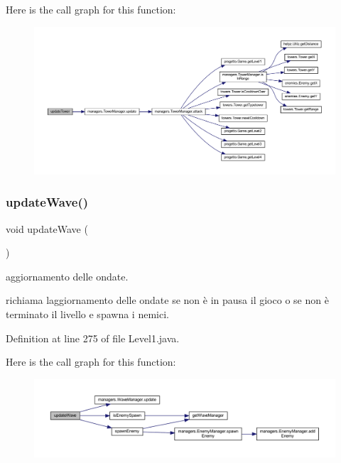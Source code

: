 Here is the call graph for this function\+:
\nopagebreak
\begin{figure}[H]
\begin{center}
\leavevmode
\includegraphics[width=350pt]{classscenes_1_1_level1_ae4fd4a959e4d782a5e7ac0eff77ba27f_cgraph}
\end{center}
\end{figure}
\mbox{\label{classscenes_1_1_level1_ab424ab29e7ab4733f2efd1e6ef3f13b1}} 
\subsubsection{\texorpdfstring{update\+Wave()}{updateWave()}}
{\footnotesize\ttfamily void update\+Wave (\begin{DoxyParamCaption}{ }\end{DoxyParamCaption})}



aggiornamento delle ondate. 

richiama l\textquotesingle{}aggiornamento delle ondate se non è in pausa il gioco o se non è terminato il livello e spawna i nemici. 

Definition at line 275 of file Level1.\+java.

Here is the call graph for this function\+:
\nopagebreak
\begin{figure}[H]
\begin{center}
\leavevmode
\includegraphics[width=350pt]{classscenes_1_1_level1_ab424ab29e7ab4733f2efd1e6ef3f13b1_cgraph}
\end{center}
\end{figure}


